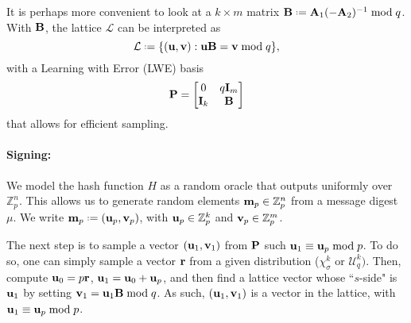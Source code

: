 \documentclass{llncs}
\newcommand{\Lcal}{{\mathcal L}}
\newcommand{\ZZ}{\mathbb{Z}}
\newcommand{\bfm}{{\bf m}}
\newcommand{\bfr}{{\bf r}}
\newcommand{\bfu}{{\bf u}}
\newcommand{\bfv}{{\bf v}}
\newcommand{\bfA}{{\bf A}}
\newcommand{\bfB}{{\bf B}}
\newcommand{\bfH}{{\bf H}}
\newcommand{\bfI}{{\bf I}}
\newcommand{\bfP}{{\bf P}}
\newcommand{\<}{\langle}
\renewcommand{\>}{\rangle}
\newcommand*{\defeq}{\mathrel{\vcenter{\baselineskip0.5ex \lineskiplimit0pt
                     \hbox{\scriptsize.}\hbox{\scriptsize.}}}%
                     =}
\begin{document}
It is perhaps more convenient to look at 
a $k\times m$ matrix $\bfB\defeq \bfA_1(-\bfA_2)^{-1} \bmod q$. With $\bfB$, the lattice $\Lcal$ can be interpreted as 
\[\Lcal \defeq \{(\bfu,\bfv): \bfu \bfB = \bfv\bmod q\},\]
with a Learning with Error (LWE) basis
\[\bf P  = \begin{bmatrix}
0& q\bfI_m \\
\bfI_k& \bfB 
\end{bmatrix}
\]
that allows for efficient sampling.

\paragraph{Signing:} 
We model the hash function $H$ as a random oracle that outputs uniformly over $\ZZ_p^n$. This allows us to generate random elements 
$\bfm_p \in \ZZ_p^n$ from a message digest $\mu$. 
We write $\bfm_p \defeq (\bfu_p, \bfv_p)$, with $\bfu_p\in\ZZ_p^k$
and  $\bfv_p\in\ZZ_p^m$.

The next step is to sample a vector $(\bfu_1, \bfv_1)$ from $\bfP$ such $\bfu_1 \equiv \bfu_p \bmod p$.
To do so, one can simply sample a vector $\bfr$
from a given distribution ($\chi^k_\sigma$ or $\mathcal U^k_q)$. 
Then, compute $\bfu_0 = p\bfr$, $\bfu_1 = \bfu_0 + \bfu_p$, and then find a lattice vector whose ``$s$-side" is $\bfu_1$ by setting $
\bfv_1 = \bfu_1\bfB\bmod q$.  As such, $(\bfu_1, \bfv_1)$ is a vector in the lattice, with $\bfu_1 \equiv \bfu_p \bmod p$. 

\end{document}
